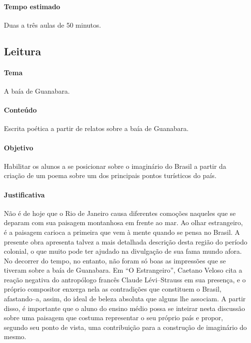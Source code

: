 \documentclass[12pt]{extarticle}
\begin{document}
\paragraph{Tempo estimado} Duas a três aulas de 50 minutos.


\subsection{Leitura}


\paragraph{Tema} A baía de Guanabara.

\paragraph{Conteúdo} Escrita poética a partir de relatos sobre a 
baía de Guanabara.

\paragraph{Objetivo} Habilitar os alunos a se posicionar sobre o imaginário
do Brasil a partir da criação de um poema sobre um dos principais pontos
turísticos do país.

\paragraph{Justificativa} Não é de hoje que o Rio de Janeiro causa 
diferentes comoções naqueles que se deparam com sua paisagem montanhosa
em frente ao mar. Ao olhar estrangeiro, é a paisagem carioca a primeira
que vem à mente quando se pensa no Brasil. 
A presente obra apresenta talvez a mais detalhada descrição desta região
do período colonial, o que muito pode ter ajudado na divulgação de sua 
fama mundo afora. 
No decorrer do tempo, no entanto, não foram só boas as impressões que se 
tiveram sobre a baía de Guanabara. Em ``O Estrangeiro'', Caetano Veloso
cita a reação negativa do antropólogo francês Claude Lévi--Strauss em sua 
presença, e o próprio compositor enxerga nela as contradições que 
constituem o Brasil, afastando--a, assim, do ideal de beleza absoluta 
que alguns lhe associam. 
A partir disso, é importante que o aluno do ensino médio possa se inteirar
nesta discussão sobre uma paisagem que costuma representar o seu próprio
país e propor, segundo seu ponto de vista, uma contribuição para a 
construção de imaginário do mesmo. 
\end{document}
